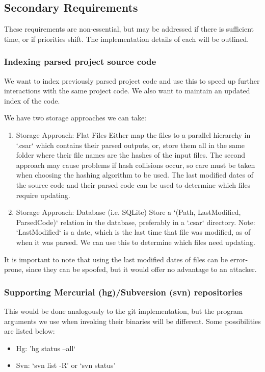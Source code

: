 \documentclass[12pt, letterpaper]{article}
\begin{document}
\subsection{Secondary Requirements}
These requirements are non-essential, but may be addressed if there is sufficient time, or if priorities shift.
The implementation details of each will be outlined.

\subsubsection{Indexing parsed project source code}
We want to index previously parsed project code and use this to speed up further interactions with the same project code.
We also want to maintain an updated index of the code.

We have two storage approaches we can take:
\begin{enumerate}
    \item Storage Approach: Flat Files\newline
    Either map the files to a parallel hierarchy in `.csar` which contains their parsed outputs, or, store them all in the same folder where their file names are the hashes of the input files.
    The second approach may cause problems if hash collisions occur, so care must be taken when choosing the hashing algorithm to be used.
    The last modified dates of the source code and their parsed code can be used to determine which files require updating.
    \item Storage Approach: Database (i.e. SQLite)\newline
    Store a `(Path, LastModified, ParsedCode)` relation in the database, preferably in a `.csar` directory.
    Note: `LastModified` is a date, which is the last time that file was modified, as of when it was parsed.
    We can use this to determine which files need updating.
\end{enumerate}

It is important to note that using the last modified dates of files can be error-prone, since they can be spoofed, but it would offer no advantage to an attacker.

\subsubsection{Supporting Mercurial (hg)/Subversion (svn) repositories}
This would be done analogously to the git implementation, but the program arguments we use when invoking their binaries will be different.
Some possibilities are listed below:
\begin{itemize}
    \item Hg: 'hg status --all`
    \item Svn: `svn list -R' or `svn status'
\end{itemize}
\end{document}
